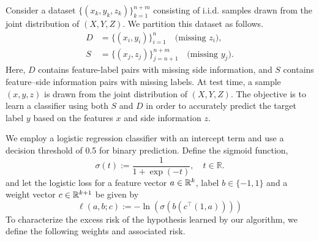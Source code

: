 Consider a dataset $\{(x_k, y_k, z_k)\}_{k=1}^{n+m}$ consisting of i.i.d. samples drawn from the joint distribution of $(X, Y, Z)$. We partition this dataset as follows.
\begin{equation}\label{eqn: partioned dataset}
    \begin{aligned}
        D &= \{(x_i, y_i)\}_{i=1}^n \quad \text{(missing } z_i\text{)}, \\
        S &= \{(x_j, z_j)\}_{j=n+1}^{n+m} \quad \text{(missing } y_j\text{)}.
    \end{aligned}
\end{equation}
Here, $D$ contains feature-label pairs with missing side information, and $S$ contains feature–side information pairs with missing labels.
At test time, a sample $(x, y, z)$ is drawn from the joint distribution of $(X, Y, Z)$. The objective is to learn a classifier using both $S$ and $D$ in order to accurately predict the target label $y$ based on the features $x$ and side information $z$.

We employ a logistic regression classifier with an intercept term and use a decision threshold of 0.5 for binary prediction. Define the sigmoid function,
\begin{equation*}
        \sigma(t) := \frac{1}{1 + \exp\left( -t \right)}, \quad t \in \mathbb{R}.
\end{equation*}
and let the logistic loss for a feature vector $a \in \mathbb{R}^k$, label $b \in \{-1,1\}$ and a weight vector $c \in \mathbb{R}^{k+1}$
be given by
\begin{equation}
\ell(a,b;c) := -\ln(\sigma(b(c^\top(1,a))))
\end{equation}
To characterize the excess risk of the hypothesis learned by our algorithm, we define the following weights and associated risk.

